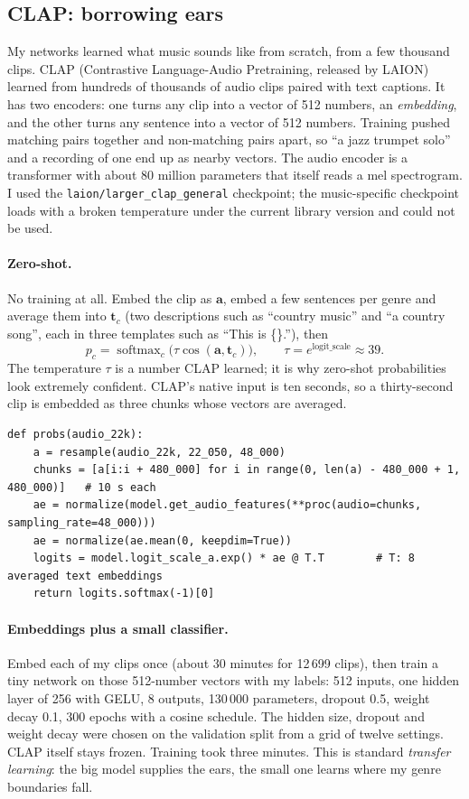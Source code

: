 \documentclass[11pt]{article}
\begin{document}
\subsection{CLAP: borrowing ears}\label{sec:clapmethod}
My networks learned what music sounds like from scratch, from a few thousand clips. CLAP (Contrastive Language-Audio Pretraining, released by LAION) learned from hundreds of thousands of audio clips paired with text captions. It has two encoders: one turns any clip into a vector of 512 numbers, an \emph{embedding}, and the other turns any sentence into a vector of 512 numbers. Training pushed matching pairs together and non-matching pairs apart, so ``a jazz trumpet solo'' and a recording of one end up as nearby vectors. The audio encoder is a transformer with about 80 million parameters that itself reads a mel spectrogram. I used the \texttt{laion/larger\_clap\_general} checkpoint; the music-specific checkpoint loads with a broken temperature under the current library version and could not be used.

\paragraph{Zero-shot.} No training at all. Embed the clip as $\mathbf{a}$, embed a few sentences per genre and average them into $\mathbf{t}_c$ (two descriptions such as ``country music'' and ``a country song'', each in three templates such as ``This is \{\}.''), then
\[
p_c = \operatorname{softmax}_c\big(\tau \cos(\mathbf{a},\mathbf{t}_c)\big), \qquad \tau = e^{\text{logit\_scale}}\approx 39 .
\]
The temperature $\tau$ is a number CLAP learned; it is why zero-shot probabilities look extremely confident. CLAP's native input is ten seconds, so a thirty-second clip is embedded as three chunks whose vectors are averaged.
\begin{lstlisting}
def probs(audio_22k):
    a = resample(audio_22k, 22_050, 48_000)
    chunks = [a[i:i + 480_000] for i in range(0, len(a) - 480_000 + 1, 480_000)]   # 10 s each
    ae = normalize(model.get_audio_features(**proc(audio=chunks, sampling_rate=48_000)))
    ae = normalize(ae.mean(0, keepdim=True))
    logits = model.logit_scale_a.exp() * ae @ T.T        # T: 8 averaged text embeddings
    return logits.softmax(-1)[0]
\end{lstlisting}

\paragraph{Embeddings plus a small classifier.} Embed each of my clips once (about 30 minutes for 12\,699 clips), then train a tiny network on those 512-number vectors with my labels: 512 inputs, one hidden layer of 256 with GELU, 8 outputs, 130\,000 parameters, dropout 0.5, weight decay 0.1, 300 epochs with a cosine schedule. The hidden size, dropout and weight decay were chosen on the validation split from a grid of twelve settings. CLAP itself stays frozen. Training took three minutes. This is standard \emph{transfer learning}: the big model supplies the ears, the small one learns where my genre boundaries fall.
\end{document}
